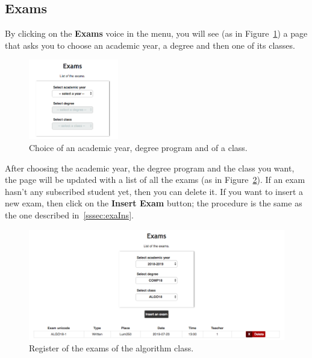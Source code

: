\subsection{Exams}
By clicking on the \textbf{Exams} voice in the menu, you will see (as in Figure~\ref{fig:chooseExam}) a page that asks you to choose an academic year, a degree and then one of its classes.
\begin{figure}[!h]
	\centering
	\includegraphics[width=0.35\textwidth]{img/chooseExam.png}
	\caption{Choice of an academic year, degree program and of a class.}
	\label{fig:chooseExam}
\end{figure}

After choosing the academic year, the degree program and the class you want, the page will be updated with a list of all the exams (as in Figure~\ref{fig:exams}). If an exam hasn't any subscribed student yet, then you can delete it. If you want to insert a new exam, then click on the \textbf{Insert Exam} button; the procedure is the same as the one described in~\ref{sssec:exaIns}.
\begin{figure}[!h]
	\centering
	\includegraphics[width=1.0\textwidth]{img/exams.png}
	\caption{Register of the exams of the algorithm class.}
	\label{fig:exams}
\end{figure}


